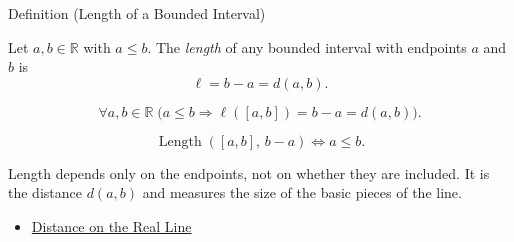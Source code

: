 \begin{definitionbox}{Definition (Length of a Bounded Interval)}
\begin{definition}
\label{def:length-of-interval}
Let $a,b\in\mathbb{R}$ with $a\leq b$.  The \emph{length} of any bounded
interval with endpoints $a$ and $b$ is
\[
  \ell=b-a=d(a,b).
\]
\end{definition}
\end{definitionbox}
\begin{remark*}
\[
\forall a,b\in\mathbb{R}\;\bigl(a\leq b \Longrightarrow \ell([a,b])=b-a=d(a,b)\bigr).
\]
\end{remark*}
\begin{remark*}
\[
\operatorname{Length}([a,b],\,b-a)
\Longleftrightarrow
a\leq b.
\]
\end{remark*}
\begin{remark*}[Interpretation]
Length depends only on the endpoints, not on whether they are included. It is the distance $d(a,b)$ and measures the size of the basic pieces of the line.
\end{remark*}
\begin{dependencies}
\begin{itemize}
  \item \hyperref[def:distance-on-real-line]{Distance on the Real Line}
\end{itemize}
\end{dependencies}
